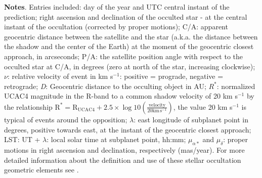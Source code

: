 \documentclass[useAMS,usenatbib]{mn2e}
\begin{document}
\begin{table}
\begin{flushleft}
\textbf{Notes}. Entries included: day of the year and UTC central instant of the prediction; right ascension and declination of the occulted star - at the central instant of the occultation (corrected by proper motions); C/A: apparent geocentric distance between the satellite and the star (a.k.a. the distance between the shadow and the center of the Earth) at the moment of the geocentric closest approach, in arcseconds; P/A: the satellite position angle with respect to the occulted star at C/A, in degrees (zero at north of the star, increasing clockwise); $\nu$: relative velocity of event in km s$^{-1}$: positive = prograde, negative = retrograde; {\it D}: Geocentric distance to the occulting object in AU; $R^*$: normalized UCAC4 magnitude in the R-band to a common shadow velocity of 20 km s$^{-1}$ by the relationship $\textrm{R}^* = \textrm{R}_{\textrm{UCAC4}} + 2.5 \times \log 10 \left(\frac{\textrm{velocity}} {20 \textrm{km}\, \textrm{s}^{-1}} \right)$, the value 20 km s$^{-1}$ is typical of events around the opposition; $\lambda$: east longitude of subplanet point in degrees, positive towards east, at the instant of the geocentric closest approach; LST: UT + $\lambda$: local solar time at subplanet point, hh:mm; $\mu_{\alpha *}$ and $\mu_{\delta}$: proper motions in right ascension and declination, respectively (mas/year). For more detailed information about the definition and use of these stellar occultation geometric elements see \cite{Assafin2010}.
\end{flushleft}
\end{table}
\end{document}
